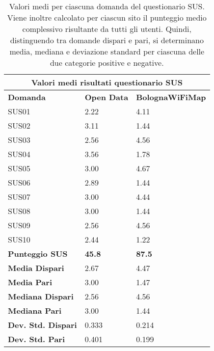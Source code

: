 \begin{center}
    \begin{table}[H]
        \centering
        \begin{tabularx}{\textwidth}{|X|X|X|}
            \hline
            \multicolumn{3}{|c|}{\textbf{Valori medi risultati questionario SUS}} \\
            \hline
            \textbf{Domanda} & \textbf{Open Data} & \textbf{BolognaWiFiMap} \\
            \hline
            SUS01 & 2.22 & 4.11 \\
            SUS02 & 3.11 & 1.44 \\
            SUS03 & 2.56 & 4.56 \\
            SUS04 & 3.56 & 1.78 \\
            SUS05 & 3.00 & 4.67 \\
            SUS06 & 2.89 & 1.44 \\
            SUS07 & 3.00 & 4.44 \\
            SUS08 & 3.00 & 1.44 \\
            SUS09 & 2.56 & 4.56 \\
            SUS10 & 2.44 & 1.22 \\
            \hline
            \textbf{Punteggio SUS} & \textbf{45.8} & \textbf{87.5} \\
            \hline
            \textbf{Media Dispari} & 2.67 & 4.47 \\
            \textbf{Media Pari} & 3.00 & 1.47 \\
            \hline
            \textbf{Mediana Dispari} & 2.56 & 4.56 \\
            \textbf{Mediana Pari} & 3.00 & 1.44 \\
            \hline
            \textbf{Dev. Std. Dispari} & 0.333 & 0.214 \\
            \textbf{Dev. Std. Pari} & 0.401 & 0.199 \\
            \hline
        \end{tabularx}
        \caption[Valori medi totali e per domanda del questionario SUS]{Valori medi per ciascuna domanda del questionario SUS. Viene inoltre calcolato per ciascun sito il punteggio medio complessivo risultante da tutti gli utenti. Quindi, distinguendo tra domande dispari e pari, si determinano media, mediana e deviazione standard per ciascuna delle due categorie positive e negative.}
        \label{tab:sus_avg_values}
    \end{table}
\end{center}

